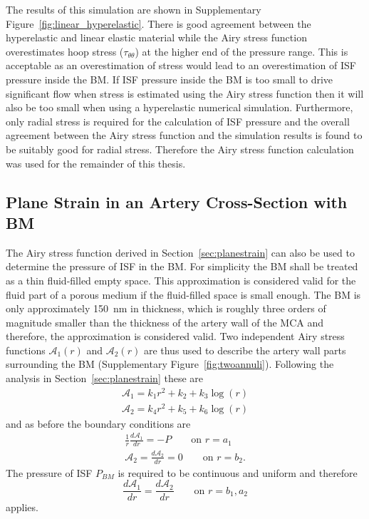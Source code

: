 \documentclass{frontiers_suppmat} %
\newcommand{\beq}{\begin{equation}}
\newcommand{\eeq}{\end{equation}}
\newcommand{\Airy}{\mathcal{A}}
\begin{document}
The results of this simulation are shown in Supplementary Figure~\ref{fig:linear_hyperelastic}. There is good agreement between the hyperelastic and linear elastic material while the Airy stress function overestimates hoop stress ($\tau_{\theta\theta}$) at the higher end of the pressure range. This is acceptable as an overestimation of stress would lead to an overestimation of ISF pressure inside the BM. If ISF pressure inside the BM is too small to drive significant flow when stress is estimated using the Airy stress function then it will also be too small when using a hyperelastic numerical simulation. Furthermore, only radial stress is required for the calculation of ISF pressure and the overall agreement between the Airy stress function and the simulation results is found to be suitably good for radial stress. Therefore the Airy stress function calculation was used for the remainder of this thesis. 


\subsection{Plane Strain in an Artery Cross-Section with BM}
\label{sec:bm_stress}

The Airy stress function derived in Section~\ref{sec:planestrain} can also be used to determine the pressure of ISF in the BM. For simplicity the BM shall be treated as a thin fluid-filled empty space. This approximation is considered valid for the fluid part of a porous medium if the fluid-filled space is small enough. The BM is only approximately \SI{150}{\nano\metre} in thickness, which is roughly three orders of magnitude smaller than the thickness of the artery wall of the MCA and therefore, the approximation is considered valid. Two independent Airy stress functions $\Airy_1(r)$ and $\Airy_2(r)$ are thus used to describe the artery wall parts surrounding the BM (Supplementary Figure~\ref{fig:twoannuli}). Following the analysis in Section~\ref{sec:planestrain} these are
\begin{gather}
\Airy_1 = k_1 r^2 + k_2 + k_3 \log(r)\\
\Airy_2 = k_4 r^2 + k_5 + k_6 \log(r)
\end{gather}
and as before the boundary conditions are
\begin{gather}
\frac{1}{r} \frac{d \Airy_1}{dr} = -P \qquad \text{on } r = a_1\\
\Airy_2 = \frac{d \Airy_2}{dr} = 0 \qquad \text{on } r = b_2.
\end{gather}
The pressure of ISF $P_{BM}$ is required to be continuous and uniform and therefore
\beq
\frac{d \Airy_1}{dr} = \frac{d \Airy_2}{dr} \qquad \text{on } r = b_1, a_2
\eeq
applies. 
\end{document}
